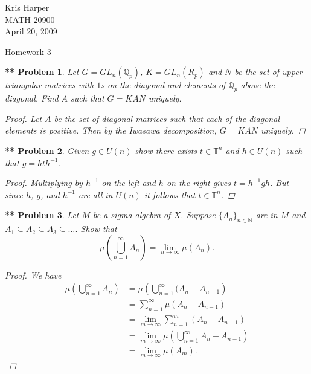 \documentclass{article}
\newtheorem{**}{** Problem}
\begin{document}
\begin{flushright}
Kris Harper\\

MATH 20900\\

April 20, 2009
\end{flushright}

\begin{center}
Homework 3
\end{center}

\begin{flushleft}

\begin{**}
Let $G = GL_n (\mathbb{Q}_p)$, $K = GL_n (R_p)$ and $N$ be the set of upper triangular matrices with $1$s on the diagonal and elements of $\mathbb{Q}_p$ above the diagonal. Find $A$ such that $G = KAN$ uniquely.
\begin{proof}
Let $A$ be the set of diagonal matrices such that each of the diagonal elements is positive. Then by the Iwasawa decomposition, $G = KAN$ uniquely.
\end{proof}
\end{**}

\begin{**}
Given $g \in U(n)$ show there exists $t \in \mathbb{T}^n$ and $h \in U(n)$ such that $g = hth^{-1}$.
\begin{proof}
Multiplying by $h^{-1}$ on the left and $h$ on the right gives $t = h^{-1}gh$. But since $h$, $g$, and $h^{-1}$ are all in $U(n)$ it follows that $t \in \mathbb{T}^n$.
\end{proof}
\end{**}

\begin{**}
Let $M$ be a sigma algebra of $X$. Suppose $\{A_n\}_{n \in \mathbb{N}}$ are in $M$ and $A_1 \subseteq A_2 \subseteq A_3 \subseteq \dots$. Show that
\[
\mu \left (\bigcup_{n=1}^{\infty} A_n \right ) = \lim_{n \rightarrow \infty} \mu (A_n).
\]
\begin{proof}
We have
\begin{align*}
\mu \left (\bigcup_{n=1}^{\infty} A_n \right )
&= \mu \left (\bigcup_{n=1}^{\infty} (A_n-A_{n-1} \right )\\
&= \sum_{n=1}^{\infty} \mu (A_n - A_{n-1})\\
&= \lim_{m \rightarrow \infty} \sum_{n=1}^{m} (A_n-A_{n-1})\\
&= \lim_{m \rightarrow \infty} \mu \left (\bigcup_{n=1}^{\infty} A_n - A_{n-1}\right )\\
&= \lim_{m \rightarrow \infty} \mu (A_m).
\end{align*}
\end{proof}
\end{**}


\end{flushleft}
\end{document}
